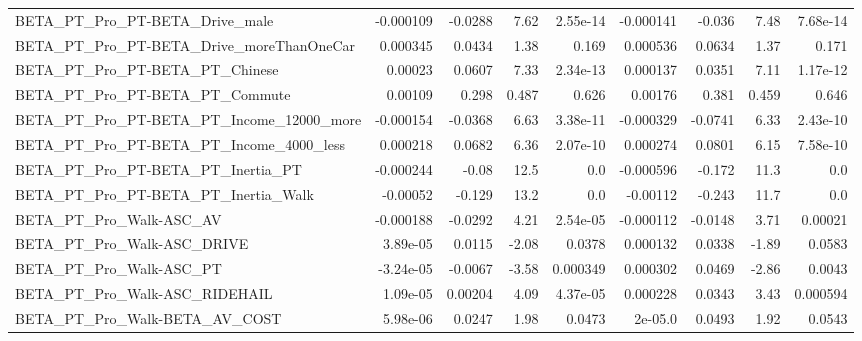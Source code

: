 \begin{tabular}{lrrrrrrrr}
BETA\_PT\_Pro\_PT-BETA\_Drive\_male                     &   -0.000109 &      -0.0288 &     7.62 & 2.55e-14 &  -0.000141 &      -0.036 &         7.48 &      7.68e-14 \\
BETA\_PT\_Pro\_PT-BETA\_Drive\_moreThanOneCar           &    0.000345 &       0.0434 &     1.38 &    0.169 &   0.000536 &      0.0634 &         1.37 &         0.171 \\
BETA\_PT\_Pro\_PT-BETA\_PT\_Chinese                     &     0.00023 &       0.0607 &     7.33 & 2.34e-13 &   0.000137 &      0.0351 &         7.11 &      1.17e-12 \\
BETA\_PT\_Pro\_PT-BETA\_PT\_Commute                     &     0.00109 &        0.298 &    0.487 &    0.626 &    0.00176 &       0.381 &        0.459 &         0.646 \\
BETA\_PT\_Pro\_PT-BETA\_PT\_Income\_12000\_more           &   -0.000154 &      -0.0368 &     6.63 & 3.38e-11 &  -0.000329 &     -0.0741 &         6.33 &      2.43e-10 \\
BETA\_PT\_Pro\_PT-BETA\_PT\_Income\_4000\_less            &    0.000218 &       0.0682 &     6.36 & 2.07e-10 &   0.000274 &      0.0801 &         6.15 &      7.58e-10 \\
BETA\_PT\_Pro\_PT-BETA\_PT\_Inertia\_PT                  &   -0.000244 &        -0.08 &     12.5 &      0.0 &  -0.000596 &      -0.172 &         11.3 &           0.0 \\
BETA\_PT\_Pro\_PT-BETA\_PT\_Inertia\_Walk                &    -0.00052 &       -0.129 &     13.2 &      0.0 &   -0.00112 &      -0.243 &         11.7 &           0.0 \\
BETA\_PT\_Pro\_Walk-ASC\_AV                            &   -0.000188 &      -0.0292 &     4.21 & 2.54e-05 &  -0.000112 &     -0.0148 &         3.71 &       0.00021 \\
BETA\_PT\_Pro\_Walk-ASC\_DRIVE                         &    3.89e-05 &       0.0115 &    -2.08 &   0.0378 &   0.000132 &      0.0338 &        -1.89 &        0.0583 \\
BETA\_PT\_Pro\_Walk-ASC\_PT                            &   -3.24e-05 &      -0.0067 &    -3.58 & 0.000349 &   0.000302 &      0.0469 &        -2.86 &        0.0043 \\
BETA\_PT\_Pro\_Walk-ASC\_RIDEHAIL                      &    1.09e-05 &      0.00204 &     4.09 & 4.37e-05 &   0.000228 &      0.0343 &         3.43 &      0.000594 \\
BETA\_PT\_Pro\_Walk-BETA\_AV\_COST                      &    5.98e-06 &       0.0247 &     1.98 &   0.0473 &    2e-05.0 &      0.0493 &         1.92 &        0.0543 \\

\end{tabular}
